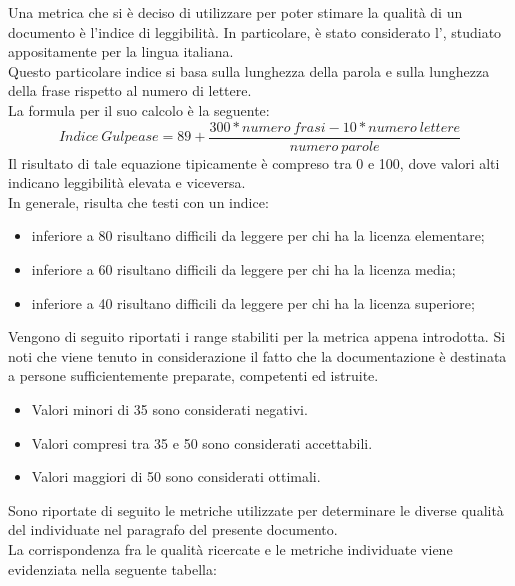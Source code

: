 					Una metrica che si è deciso di utilizzare per poter stimare la qualità di un documento è l'indice di leggibilità. In particolare, è 
					stato considerato l', studiato appositamente per la lingua italiana.\\
					Questo particolare indice si basa sulla lunghezza della parola e sulla lunghezza della frase rispetto al numero di lettere.\\
					La formula per il suo calcolo è la seguente:
					\begin{equation}
						\label{eq:gulpease}
						Indice\ Gulpease = 89 + \frac{300*numero\ frasi-10*numero\ lettere}{numero\ parole}
					\end{equation}
					Il risultato di tale equazione tipicamente è compreso tra 0 e 100, dove valori alti indicano leggibilità elevata e viceversa.\\
					In generale, risulta che testi con un indice:
					\begin{itemize}
						\item inferiore a 80 risultano difficili da leggere per chi ha la licenza elementare;
						\item inferiore a 60 risultano difficili da leggere per chi ha la licenza media;
						\item inferiore a 40 risultano difficili da leggere per chi ha la licenza superiore;
					\end{itemize}
					Vengono di seguito riportati i range stabiliti per la metrica appena introdotta. Si noti che viene tenuto in considerazione il fatto 
					che la documentazione è destinata a persone sufficientemente preparate, competenti ed istruite.
					\begin{itemize}
						\item Valori minori di 35 sono considerati negativi.
						\item Valori compresi tra 35 e 50 sono considerati accettabili.
						\item Valori maggiori di 50 sono considerati ottimali.
					\end{itemize}
			Sono riportate di seguito le metriche utilizzate per determinare le diverse qualità del  individuate nel paragrafo  del presente documento.
			\\La corrispondenza fra le qualità ricercate e le metriche individuate viene evidenziata nella seguente tabella:\\
